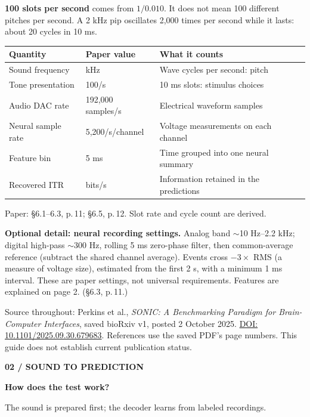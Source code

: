 \documentclass[11pt,letterpaper]{article}
\newcommand{\pagehead}[3]{
 {\small\bfseries\color{accent}#1}\par\vspace{2pt}
 {\fontsize{23}{26}\selectfont\bfseries\color{ink}#2}\par
 {\color{muted}#3}\par\vspace{4pt}}
\newcommand{\src}[1]{\par{\fontsize{8.5}{10}\selectfont\color{muted}Paper: #1\par}}
\newcommand{\smallnote}[1]{{\small\color{muted}#1\par}}
\begin{document}
\textbf{100 slots per second} comes from $1/0.010$. It does not mean 100 different pitches per second. A 2 kHz pip oscillates 2,000 times per second while it lasts: about 20 cycles in 10 ms.

{\small\begin{tabularx}{\linewidth}{@{}p{1.42in}p{1.21in}L@{}}
\toprule
\textbf{Quantity} & \textbf{Paper value} & \textbf{What it counts}\\\midrule
Sound frequency & kHz & Wave cycles per second: pitch\\
Tone presentation & 100/s & 10 ms slots: stimulus choices\\
Audio DAC rate & 192,000 samples/s & Electrical waveform samples\\
Neural sample rate & 5,200/s/channel & Voltage measurements on each channel\\
Feature bin & 5 ms & Time grouped into one neural summary\\
Recovered ITR & bits/s & Information retained in the predictions\\\bottomrule
\end{tabularx}}
\src{\S6.1--6.3, p.\,11; \S6.5, p.\,12. Slot rate and cycle count are derived.}

\smallnote{\textbf{Optional detail: neural recording settings.} Analog band $\sim$10 Hz--2.2 kHz; digital high-pass $\sim$300 Hz, rolling 5 ms zero-phase filter, then common-average reference (subtract the shared channel average). Events cross $-3\times$ RMS (a measure of voltage size), estimated from the first 2 s, with a minimum 1 ms interval. These are paper settings, not universal requirements. Features are explained on page 2. (\S6.3, p.\,11.)}

\smallnote{Source throughout: Perkins et al., \textit{SONIC: A Benchmarking Paradigm for Brain-Computer Interfaces}, saved bioRxiv v1, posted 2 October 2025. \href{https://doi.org/10.1101/2025.09.30.679683}{DOI: 10.1101/2025.09.30.679683}. References use the saved PDF's page numbers. This guide does not establish current publication status.}

\newpage
\pagehead{02 / SOUND TO PREDICTION}{How does the test work?}{The sound is prepared first; the decoder learns from labeled recordings.}

\begin{center}
\end{center}
\end{document}
